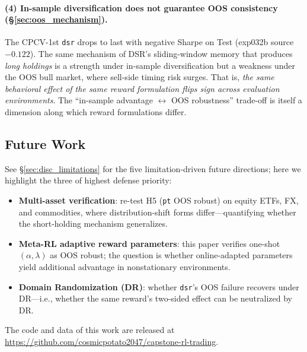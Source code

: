 \documentclass[11pt, a4paper]{article}
\begin{document}
\paragraph{(4) In-sample diversification does not guarantee OOS consistency
(\S\ref{sec:oos_mechanism}).}
The CPCV-1st \texttt{dsr} drops to last with negative Sharpe on Test
(exp032b source $-0.122$). The same mechanism of DSR's sliding-window memory
that produces \emph{long holdings} is a strength under in-sample
diversification but a weakness under the OOS bull market, where sell-side
timing risk surges. That is, \emph{the same behavioral effect of the same
reward formulation flips sign across evaluation environments}. The
``in-sample advantage $\leftrightarrow$ OOS robustness'' trade-off is itself
a dimension along which reward formulations differ.

\subsection*{Future Work}

See \S\ref{sec:disc_limitations} for the five limitation-driven future
directions; here we highlight the three of highest defense priority:
\begin{itemize}[leftmargin=*]
\item \textbf{Multi-asset verification}: re-test H5 (\texttt{pt} OOS
robust) on equity ETFs, FX, and commodities, where distribution-shift
forms differ---quantifying whether the short-holding mechanism generalizes.
\item \textbf{Meta-RL adaptive reward parameters}: this paper verifies
one-shot $(\alpha, \lambda)$ as OOS robust; the question is whether
online-adapted parameters yield additional advantage in nonstationary
environments.
\item \textbf{Domain Randomization (DR)}: whether \texttt{dsr}'s OOS
failure recovers under DR---i.e., whether the same reward's two-sided effect
can be neutralized by DR.
\end{itemize}

The code and data of this work are released at
\url{https://github.com/cosmicpotato2047/capstone-rl-trading}.

\clearpage


\end{document}
